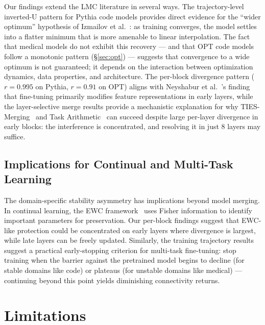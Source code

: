\documentclass[11pt,a4paper]{article}
\begin{document}
Our findings extend the LMC literature in several ways. The trajectory-level inverted-U pattern for Pythia code models provides direct evidence for the ``wider optimum'' hypothesis of Izmailov et al.~\cite{izmailov2018averaging}: as training converges, the model settles into a flatter minimum that is more amenable to linear interpolation. The fact that medical models do not exhibit this recovery — and that OPT code models follow a monotonic pattern (\S\ref{sec:opt}) — suggests that convergence to a wide optimum is not guaranteed; it depends on the interaction between optimization dynamics, data properties, and architecture. The per-block divergence pattern ($r = 0.995$ on Pythia, $r = 0.91$ on OPT) aligns with Neyshabur et al.~\cite{neyshabur2020transfer}'s finding that fine-tuning primarily modifies feature representations in early layers, while the layer-selective merge results provide a mechanistic explanation for why TIES-Merging~\cite{yadav2023ties} and Task Arithmetic~\cite{ilharco2023editing} can succeed despite large per-layer divergence in early blocks: the interference is concentrated, and resolving it in just 8 layers may suffice.

\subsection{Implications for Continual and Multi-Task Learning}

The domain-specific stability asymmetry has implications beyond model merging. In continual learning, the EWC framework~\cite{kirkpatrick2017ewc} uses Fisher information to identify important parameters for preservation. Our per-block findings suggest that EWC-like protection could be concentrated on early layers where divergence is largest, while late layers can be freely updated. Similarly, the training trajectory results suggest a practical early-stopping criterion for multi-task fine-tuning: stop training when the barrier against the pretrained model begins to decline (for stable domains like code) or plateaus (for unstable domains like medical) — continuing beyond this point yields diminishing connectivity returns.

\section{Limitations}
\end{document}
